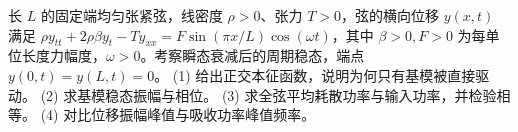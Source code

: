 长 \(L\) 的固定端均匀张紧弦，线密度 \(\rho>0\)、张力 \(T>0\)，弦的横向位移 \(y(x,t)\) 满足 \(\rho y_{tt}+2\rho\beta y_t-Ty_{xx}=F\sin(\pi x/L)\cos(\omega t)\)，其中 \(\beta>0,F>0\) 为每单位长度力幅度，\(\omega>0\)。考察瞬态衰减后的周期稳态，端点 \(y(0,t)=y(L,t)=0\)。
(1) 给出正交本征函数，说明为何只有基模被直接驱动。
(2) 求基模稳态振幅与相位。
(3) 求全弦平均耗散功率与输入功率，并检验相等。
(4) 对比位移振幅峰值与吸收功率峰值频率。
